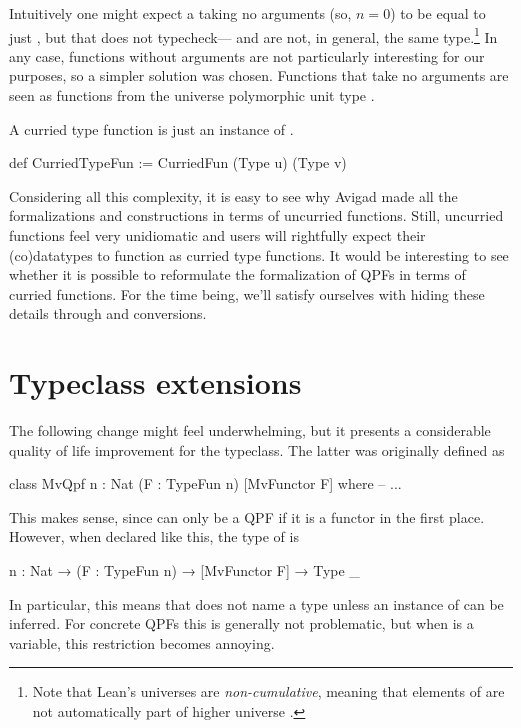 Intuitively one might expect a  taking no arguments (so, $n = 0$) to be equal to just , but that does not typecheck--- and  are not, in general, the same type.\footnote{Note that Lean's universes are \emph{non-cumulative}, meaning that elements of  are not automatically part of higher universe .}
In any case, functions without arguments are not particularly interesting for our purposes, so a simpler solution was chosen. 
Functions that take no arguments are seen as functions from the universe polymorphic unit type .

A curried type function is just an instance of .
\begin{leancode}
  def CurriedTypeFun := CurriedFun (Type u) (Type v)
\end{leancode}



Considering all this complexity, it is easy to see why Avigad \etal{} made all the formalizations and
constructions in terms of uncurried functions. 
Still, uncurried functions feel very unidiomatic and users will rightfully expect their (co)datatypes
to function as curried type functions. 
It would be interesting to see whether it is possible to reformulate the formalization of QPFs in
terms of curried functions. 
For the time being, we'll satisfy ourselves with hiding these details through
 and  conversions.



\section{Typeclass extensions}
The following change might feel underwhelming, but it presents a considerable quality 
of life improvement for the  typeclass. The latter was originally defined as
\begin{leancode}
    class MvQpf {n : Nat} (F : TypeFun n) [MvFunctor F] where
        -- ...
\end{leancode}
This makes sense, since  can only be a QPF if it is a functor in the first place.
However, when declared like this, the type of  is 

\begin{leancode}
    {n : Nat} → (F : TypeFun n) → [MvFunctor F] → Type _
\end{leancode}
In particular, this means that  does not name a type unless an instance of  can be inferred. For concrete QPFs this is generally not problematic, but when  is a variable, this restriction becomes annoying. 

